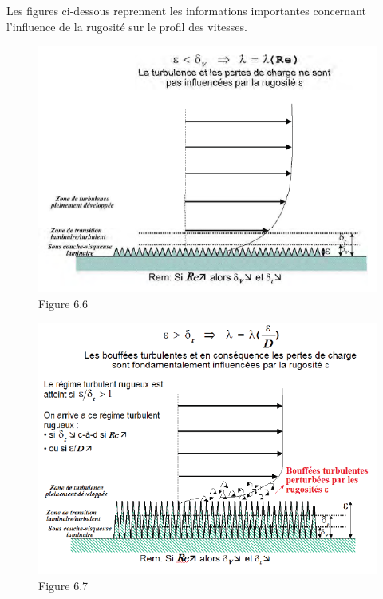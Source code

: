 Les figures ci-dessous reprennent les informations importantes concernant l'influence de la rugosité sur le profil des vitesses.

\begin{minipage}{0.49\textwidth}
\begin{figure}[H]
\begin{center}
\includegraphics[scale=0.35]{ch6/67.png}
\caption*{Figure 6.6}
\end{center}
\end{figure}
\end{minipage}
\begin{minipage}{0.49\textwidth}
\begin{figure}[H]
\begin{center}
\includegraphics[scale=0.35]{ch6/68.png}
\caption*{Figure 6.7}
\end{center}
\end{figure}
\end{minipage}

